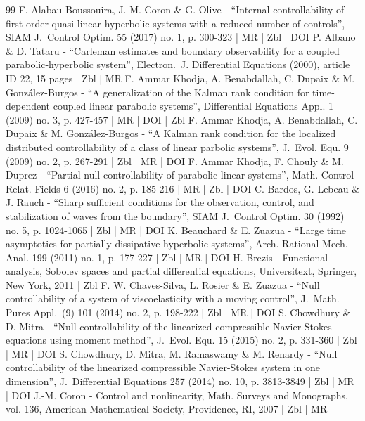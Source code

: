 \begin{thebibliography}{99}
F. Alabau-Boussouira, J.-M. Coron \& G. Olive - “Internal controllability of first order quasi-linear hyperbolic systems with a reduced number of controls”, SIAM J. Control Optim. 55 (2017) no. 1, p. 300-323 | MR | Zbl | DOI
P. Albano \& D. Tataru - “Carleman estimates and boundary observability for a coupled parabolic-hyperbolic system”, Electron. J. Differential Equations (2000), article ID 22, 15 pages | Zbl | MR
F. Ammar Khodja, A. Benabdallah, C. Dupaix \& M. González-Burgos - “A generalization of the Kalman rank condition for time-dependent coupled linear parabolic systems”, Differential Equations Appl. 1 (2009) no. 3, p. 427-457 | MR | DOI | Zbl
F. Ammar Khodja, A. Benabdallah, C. Dupaix \& M. González-Burgos - “A Kalman rank condition for the localized distributed controllability of a class of linear parbolic systems”, J. Evol. Equ. 9 (2009) no. 2, p. 267-291 | Zbl | MR | DOI
F. Ammar Khodja, F. Chouly \& M. Duprez - “Partial null controllability of parabolic linear systems”, Math. Control Relat. Fields 6 (2016) no. 2, p. 185-216 | MR | Zbl | DOI
C. Bardos, G. Lebeau \& J. Rauch - “Sharp sufficient conditions for the observation, control, and stabilization of waves from the boundary”, SIAM J. Control Optim. 30 (1992) no. 5, p. 1024-1065 | Zbl | MR | DOI
K. Beauchard \& E. Zuazua - “Large time asymptotics for partially dissipative hyperbolic systems”, Arch. Rational Mech. Anal. 199 (2011) no. 1, p. 177-227 | Zbl | MR | DOI
H. Brezis - Functional analysis, Sobolev spaces and partial differential equations, Universitext, Springer, New York, 2011 | Zbl
F. W. Chaves-Silva, L. Rosier \& E. Zuazua - “Null controllability of a system of viscoelasticity with a moving control”, J. Math. Pures Appl. (9) 101 (2014) no. 2, p. 198-222 | Zbl | MR | DOI
S. Chowdhury \& D. Mitra - “Null controllability of the linearized compressible Navier-Stokes equations using moment method”, J. Evol. Equ. 15 (2015) no. 2, p. 331-360 | Zbl | MR | DOI
S. Chowdhury, D. Mitra, M. Ramaswamy \& M. Renardy - “Null controllability of the linearized compressible Navier-Stokes system in one dimension”, J. Differential Equations 257 (2014) no. 10, p. 3813-3849 | Zbl | MR | DOI
J.-M. Coron - Control and nonlinearity, Math. Surveys and Monographs, vol. 136, American Mathematical Society, Providence, RI, 2007 | Zbl | MR

\end{thebibliography}
